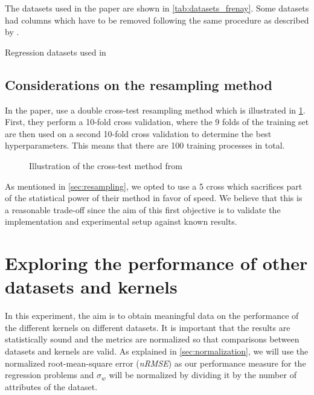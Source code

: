 The datasets used in the paper are shown in \cref{tab:datasets_frenay}. Some
datasets had columns which have to be removed following the same procedure as
described by \textcite{frenayParameterinsensitiveKernelExtreme2011}.
\begin{table}[H]
    \caption{Regression datasets used in \cite{frenayParameterinsensitiveKernelExtreme2011}}
    \label{tab:datasets_frenay}
    
\end{table}


\subsection{Considerations on the resampling method}%
\label{sec:considerations-on-the-resampling-method}

In the paper, \citeauthor{frenayParameterinsensitiveKernelExtreme2011} use a
double cross-test resampling method which is illustrated in
\cref{fig:frenay-cross-test}. First, they perform a 10-fold cross validation,
where the 9 folds of the training set are then used on a second 10-fold cross
validation to determine the best hyperparameters. This means that there are 100
training processes in total.

\begin{figure}[H]
    
    \caption{Illustration of the cross-test method from \cite{frenayParameterinsensitiveKernelExtreme2011}}
    \label{fig:frenay-cross-test}
\end{figure}

As mentioned in \cref{sec:resampling}, we opted to use a 5 cross
which sacrifices part of the statistical power of their method in favor of
speed. We believe that this is a reasonable trade-off since the aim of this
first objective is to validate the implementation and experimental setup against
known results.

\section{Exploring the performance of other datasets and kernels}%
\label{sec:exploring-the-performance-of-other-datasets-and-kernels}

In this experiment, the aim is to obtain meaningful data on the performance of
the different kernels on different datasets. It is important that the results
are statistically sound and the metrics are normalized so that comparisons
between datasets and kernels are valid. As explained in \cref{sec:normalization}, we
will use the normalized root-mean-square error (\emph{nRMSE}) as our performance
measure for the regression problems and $\sigma_w$ will be normalized by
dividing it by the number of attributes of the dataset.

